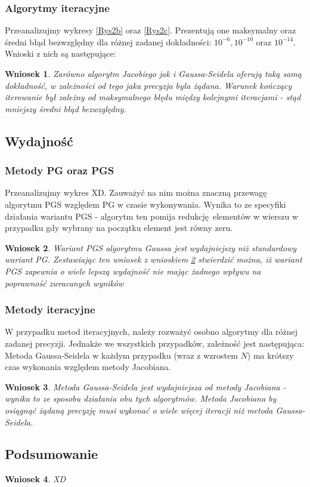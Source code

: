 \documentclass[10pt]{article}
\newtheorem{wn}{Wniosek}
\begin{document}
\subsubsection{Algorytmy iteracyjne}
Przeanalizujmy wykresy \ref{Rys2b} oraz \ref{Rys2c}. Prezentują one maksymalny oraz średni błąd bezwzględny dla różnej zadanej dokładności: $10^{-6},10^{-10}$ oraz $10^{-14}$.
Wnioski z nich są następujące:
\begin{wn}
	Zarówno algorytm Jacobiego jak i Gaussa-Seidela oferują taką samą dokładność, w zależności od tego jaka precyzja była żądana. Warunek kończący iterowanie był zależny od maksymalnego błędu między kolejnymi iteracjami - stąd mniejszy średni błąd bezwzględny. \label{wn:2}
\end{wn}
\subsection{Wydajność}
\subsubsection{Metody PG oraz PGS}
Przeanalizujmy wykres XD. Zauważyć na nim można znaczną przewagę algorytmu PGS względem PG w czasie wykonywania. Wynika to ze specyfiki działania wariantu PGS - algorytm ten pomija redukcję elementów w wierszu w przypadku gdy wybrany na początku element jest równy zeru.
\begin{wn}
	Wariant PGS algorytmu Gaussa jest wydajniejszy niż standardowy wariant PG. Zestawiając ten wniosek z wnioskiem \ref{wn:3} stwierdzić można, iż wariant PGS zapewnia o wiele lepszą wydajność nie mając żadnego wpływu na poprawność zwracanych wyników
	 \label{wn:3}
\end{wn}
\subsubsection{Metody iteracyjne}
W przypadku metod iteracyjnych, należy rozważyć osobno algorytmy dla różnej zadanej precyzji.
Jednakże we wszystkich przypadków, zależność jest następująca: Metoda Gaussa-Seidela w każdym przypadku (wraz z wzrostem $N$) ma krótszy czas wykonania względem metody Jacobiana.
\begin{wn}
	Metoda Gaussa-Seidela jest wydajniejsza od metody Jacobiana - wynika to ze sposobu działania obu tych algorytmów. Metoda Jacobiana by osiągnąć żądaną precyzję musi wykonać o wiele więcej iteracji niż metoda Gaussa-Seidela. \label{wn:4}
\end{wn}
\subsection{Podsumowanie}
\begin{wn}
	XD
\end{wn}
\end{document}

